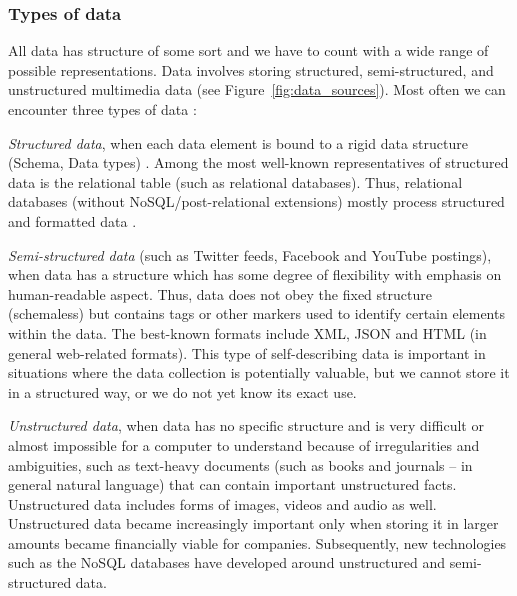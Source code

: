 			\subsubsection{Types of data}
			\label{subsec:types_of_data}
			
				All data has structure of some sort and we have to count with a wide range of possible representations. Data involves storing structured, semi-structured, and unstructured multimedia data (see Figure~\ref{fig:data_sources}). Most often we can encounter three types of data \cite{Batini2006}:								
								
									
				\textit{Structured data}, when each data element is bound to a rigid data structure (Schema, Data types) \cite{Batini2006} \cite{AndreasMeier2019}. Among the most well-known representatives of structured data is the relational table (such as relational databases). Thus, relational databases (without NoSQL/post-relational extensions) mostly process structured and formatted data \cite{AndreasMeier2019}.
				
				\textit{Semi-structured data} (such as Twitter feeds, Facebook and YouTube postings), when data has a structure which has some degree of flexibility \cite{Batini2006} with emphasis on human-readable aspect. Thus, data does not obey the fixed structure (schemaless) but contains tags or other markers used to identify certain elements within the data. The best-known formats include XML, JSON and HTML (in general web-related formats). This type of self-describing data is important in situations where the data collection is potentially valuable, but we cannot store it in a structured way, or we do not yet know its exact use.
				
				\textit{Unstructured data}, when data has no specific structure \cite{Batini2006} and is very difficult or almost impossible for a computer to understand because of irregularities and ambiguities, such as text-heavy documents (such as books and journals -- in general natural language) that can contain important unstructured facts. Unstructured data includes forms of images, videos and audio as well. Unstructured data became increasingly important only when storing it in larger amounts became financially viable for companies. Subsequently, new technologies such as the NoSQL databases have developed around unstructured and semi-structured data.
				
